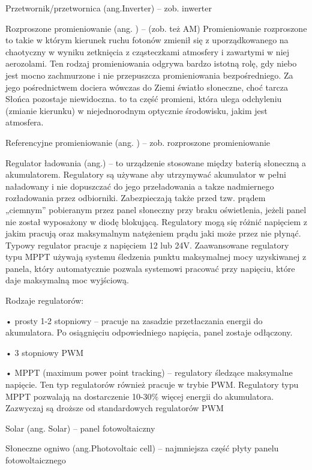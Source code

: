 \documentclass[12pt,a4paper]{article}
\begin{document}
Przetwornik/przetwornica (ang.Inverter) –  zob. inwerter

Rozproszone promieniowanie (ang. ) –  (zob. też AM) Promieniowanie rozproszone to takie w którym kierunek ruchu fotonów zmienił się z uporządkowanego na chaotyczny w wyniku zetknięcia z cząsteczkami atmosfery i zawartymi w niej aerozolami. Ten rodzaj promieniowania odgrywa bardzo istotną rolę, gdy niebo jest mocno zachmurzone i nie przepuszcza promieniowania bezpośredniego. Za jego pośrednictwem dociera wówczas do Ziemi światło słoneczne, choć tarcza Słońca pozostaje niewidoczna. to ta część promieni, która ulega odchyleniu (zmianie kierunku) w niejednorodnym optycznie środowisku, jakim jest  atmosfera.

Referencyjne promieniowanie (ang. ) – zob. rozproszone promieniowanie

Regulator ładowania (ang.) – to urządzenie stosowane między baterią słoneczną a akumulatorem. Regulatory są używane aby utrzymywać akumulator w pełni naładowany i nie dopuszczać do jego przeładowania a takze nadmiernego rozładowania przez odbiorniki. Zabezpieczają także przed tzw. prądem „ciemnym” pobieranym przez panel słoneczny przy braku oświetlenia, jeżeli panel nie został wyposażony w diodę blokującą. Regulatory mogą się różnić napięciem z jakim pracują oraz maksymalnym natężeniem prądu jaki może przez nie płynąć. Typowy regulator pracuje z napięciem 12 lub 24V. Zaawansowane regulatory typu MPPT używają systemu śledzenia punktu maksymalnej mocy uzyskiwanej z panela, który automatycznie pozwala systemowi pracować przy napięciu, które daje maksymalną moc wyjściową.

Rodzaje regulatorów:

•    prosty 1-2 stopniowy – pracuje na zasadzie przetłaczania energii do akumulatora. Po osiągnięciu odpowiedniego napięcia, panel zostaje odłączony.

•    3 stopniowy PWM

•    MPPT (maximum power point tracking) – regulatory śledzące maksymalne napięcie. Ten typ regulatorów również pracuje w trybie PWM. Regulatory typu MPPT pozwalają na dostarczenie 10-30\% więcej energii do akumulatora. Zazwyczaj są droższe od standardowych regulatorów PWM

Solar (ang. Solar) – panel fotowoltaiczny

Słoneczne ogniwo (ang.Photovoltaic cell) – najmniejsza część płyty panelu fotowoltaicznego
\end{document}
